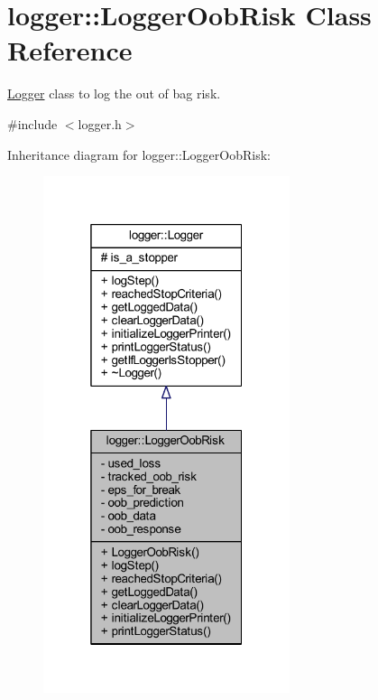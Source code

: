 \hypertarget{classlogger_1_1_logger_oob_risk}{}\section{logger\+:\+:Logger\+Oob\+Risk Class Reference}
\label{classlogger_1_1_logger_oob_risk}


\mbox{\hyperlink{classlogger_1_1_logger}{Logger}} class to log the out of bag risk.  




{\ttfamily \#include $<$logger.\+h$>$}



Inheritance diagram for logger\+:\+:Logger\+Oob\+Risk\+:
\nopagebreak
\begin{figure}[H]
\begin{center}
\leavevmode
\includegraphics[width=205pt]{classlogger_1_1_logger_oob_risk__inherit__graph}
\end{center}
\end{figure}


